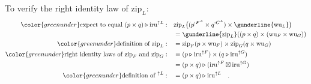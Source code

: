To verify the right identity law of $\text{zip}_{L}$:
\begin{align*}
{\color{greenunder}\text{expect to equal }(p\times q)\triangleright\text{iru}^{\uparrow L}:}\quad & \text{zip}_{L}\big((p^{:F^{A}}\times q^{:G^{A}})\times\gunderline{\text{wu}_{L}}\big)\\
 & =\gunderline{\text{zip}_{L}}((p\times q)\times(\text{wu}_{F}\times\text{wu}_{G}))\\
{\color{greenunder}\text{definition of }\text{zip}_{L}:}\quad & =\text{zip}_{F}(p\times\text{wu}_{F})\times\text{zip}_{G}(q\times\text{wu}_{G})\\
{\color{greenunder}\text{right identity laws of }\text{zip}_{F}\text{ and }\text{zip}_{G}:}\quad & =(p\triangleright\text{iru}^{\uparrow F})\times(q\triangleright\text{iru}^{\uparrow G})\\
 & =(p\times q)\triangleright(\text{iru}^{\uparrow F}\boxtimes\text{iru}^{\uparrow G})\\
{\color{greenunder}\text{definition of }^{\uparrow L}:}\quad & =(p\times q)\triangleright\text{iru}^{\uparrow L}\quad.
\end{align*}


